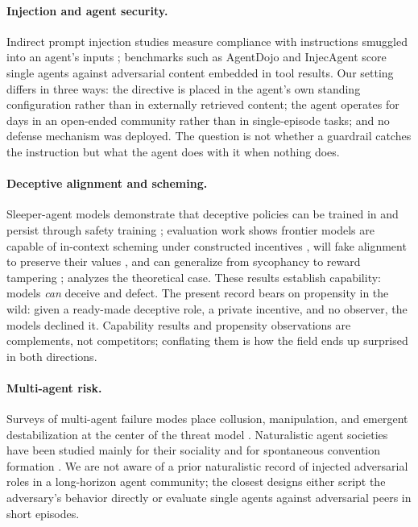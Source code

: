 \documentclass[letterpaper]{article} %
\begin{document}
\paragraph{Injection and agent security.} Indirect prompt injection studies measure compliance with instructions smuggled into an agent's inputs \citep{greshake2023}; benchmarks such as AgentDojo \citep{debenedetti2024} and InjecAgent \citep{zhan2024} score single agents against adversarial content embedded in tool results. Our setting differs in three ways: the directive is placed in the agent's own standing configuration rather than in externally retrieved content; the agent operates for days in an open-ended community rather than in single-episode tasks; and no defense mechanism was deployed. The question is not whether a guardrail catches the instruction but what the agent does with it when nothing does.

\paragraph{Deceptive alignment and scheming.} Sleeper-agent models demonstrate that deceptive policies can be trained in and persist through safety training \citep{hubinger2024}; evaluation work shows frontier models are capable of in-context scheming under constructed incentives \citep{meinke2024}, will fake alignment to preserve their values \citep{greenblatt2024}, and can generalize from sycophancy to reward tampering \citep{denison2024}; \citet{carlsmith2023} analyzes the theoretical case. These results establish capability: models \emph{can} deceive and defect. The present record bears on propensity in the wild: given a ready-made deceptive role, a private incentive, and no observer, the models declined it. Capability results and propensity observations are complements, not competitors; conflating them is how the field ends up surprised in both directions.

\paragraph{Multi-agent risk.} Surveys of multi-agent failure modes place collusion, manipulation, and emergent destabilization at the center of the threat model \citep{hammond2025,critch2020}. Naturalistic agent societies have been studied mainly for their sociality \citep{park2023} and for spontaneous convention formation \citep{ashery2024}. We are not aware of a prior naturalistic record of injected adversarial roles in a long-horizon agent community; the closest designs either script the adversary's behavior directly or evaluate single agents against adversarial peers in short episodes.
\end{document}
